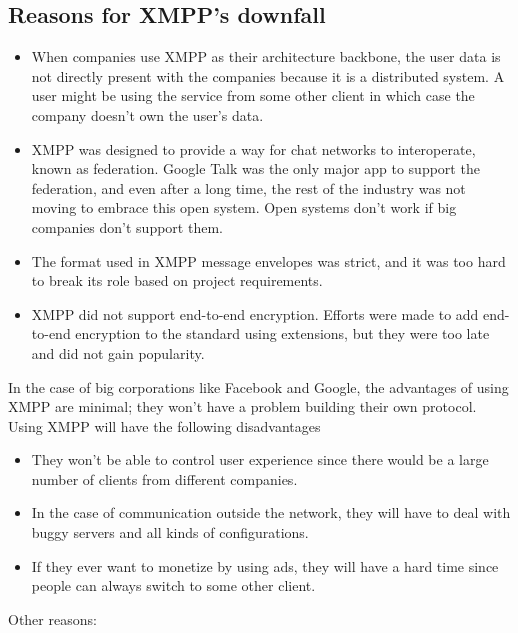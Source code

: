 \documentclass[12pt, conference, a4paper]{article}
\begin{document}
\subsection{Reasons for XMPP's downfall}
\begin{itemize}
\item When companies use XMPP as their architecture backbone, the user data is not directly present with the companies because it is a distributed system. A user might be using the service from some other client in which case the company doesn’t own the user’s data.
\item XMPP was designed to provide a way for chat networks to interoperate, known as federation. Google Talk was the only major app to support the federation, and even after a long time, the rest of the industry was not moving to embrace this open system. Open systems don't work if big companies don't support them.
\item The format used in XMPP message envelopes was strict, and it was too hard to break its role based on project requirements.
\item XMPP did not support end-to-end encryption. Efforts were made to add end-to-end encryption to the standard using extensions, but they were too late and did not gain popularity.
\end{itemize}
In the case of big corporations like Facebook and Google, the advantages of using XMPP are minimal; they won't have a problem building their own protocol.\\
Using XMPP will have the following disadvantages
\begin{itemize}
\item They won't be able to control user experience since there would be a large number of clients from different companies.
\item In the case of communication outside the network, they will have to deal with buggy servers and all kinds of configurations.
\item If they ever want to monetize by using ads, they will have a hard time since people can always switch to some other client.
\end{itemize}
Other reasons:
\end{document}
